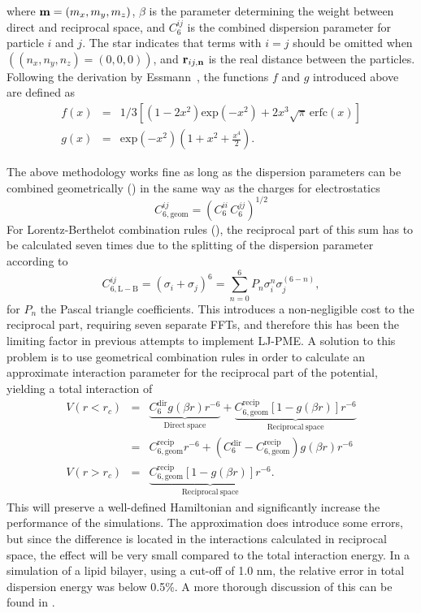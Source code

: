 where ${\bf m}=(m_x,m_y,m_z)$, $\beta$ is the parameter determining the weight between
direct and reciprocal space, and ${C^{ij}_6}$ is the combined dispersion
parameter for particle $i$ and $j$. The star indicates that terms
with $i = j$ should be omitted when $((n_x,n_y,n_z)=(0,0,0))$, and
${\bf r}_{ij,{\bf n}}$ is the real distance between the particles.
Following the derivation by Essmann~\cite{Essmann95}, the functions $f$ and $g$ introduced above are defined as
\begin{eqnarray}
f(x)&=&1/3\left[(1-2x^2){\mathrm{exp}}(-x^2) + 2{x^3}\sqrt{\pi}\,{\mathrm{erfc}}(x) \right] \\
g(x)&=&{\mathrm{exp}}(-x^2)(1+x^2+\frac{x^4}{2}).
\end{eqnarray}

The above methodology works fine as long as the dispersion parameters can be combined geometrically () in the same
way as the charges for electrostatics
\begin{equation}
C^{ij}_{6,\mathrm{geom}} = \left(C^{ii}_6 \, C^{jj}_6\right)^{1/2}
\end{equation}
For Lorentz-Berthelot combination rules (), the reciprocal part of this sum has to be calculated
seven times due to the splitting of the dispersion parameter according to
\begin{equation}
C^{ij}_{6,\mathrm{L-B}} = (\sigma_i+\sigma_j)^6=\sum_{n=0}^{6} P_{n}\sigma_{i}^{n}\sigma_{j}^{(6-n)},
\end{equation}
for $P_{n}$ the Pascal triangle coefficients. This introduces a
non-negligible cost to the reciprocal part, requiring seven separate
FFTs, and therefore this has been the limiting factor in previous
attempts to implement LJ-PME. A solution to this problem is to use
geometrical combination rules in order to calculate an approximate
interaction parameter for the reciprocal part of the potential,
yielding a total interaction of
\begin{eqnarray}
V(r<r_c) & = & \underbrace{C^{\mathrm{dir}}_6 g(\beta r) r^{-6}}_{\mathrm{Direct \  space}} + \underbrace{C^\mathrm{recip}_{6,\mathrm{geom}} [1 - g(\beta r)] r^{-6}}_{\mathrm{Reciprocal \  space}} \nonumber \\
&=& C^\mathrm{recip}_{6,\mathrm{geom}}r^{-6} + \left(C^{\mathrm{dir}}_6-C^\mathrm{recip}_{6,\mathrm{geom}}\right)g(\beta r)r^{-6} \\
V(r>r_c) & = & \underbrace{C^\mathrm{recip}_{6,\mathrm{geom}} [1 - g(\beta r)] r^{-6}}_{\mathrm{Reciprocal \  space}}.
\end{eqnarray}
This will preserve a well-defined Hamiltonian and significantly increase
the performance of the simulations. The approximation does introduce
some errors, but since the difference is located in the interactions
calculated in reciprocal space, the effect will be very small compared
to the total interaction energy. In a simulation of a lipid bilayer,
using a cut-off of 1.0 nm, the relative error in total dispersion
energy was below 0.5\%. A more thorough discussion of this can be
found in \cite{Wennberg13}.

